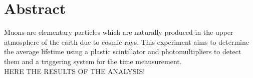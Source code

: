 \thispagestyle{plain}
\section*{Abstract}
Muons are elementary particles which are naturally produced in the upper atmosphere of the earth due 
to cosmic rays. This experiment aims to determine the average lifetime using a plastic scintillator and
photomultipliers to detect them and a triggering system for the time meausurement.\\
HERE THE RESULTS OF THE ANALYSIS!
